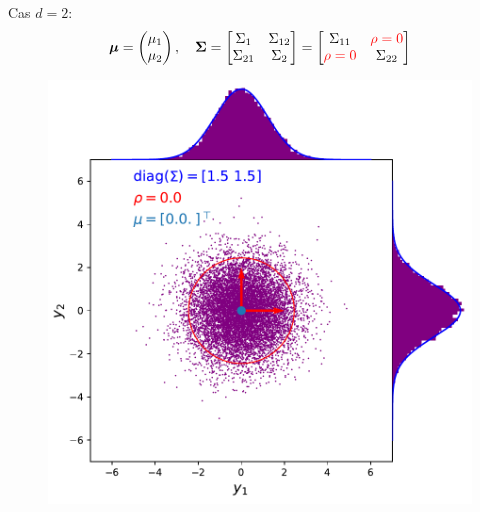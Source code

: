 \documentclass[xcolor=svgnames, t]{beamer}
\newcommand{\vectorx}[1]{\boldsymbol{\MakeLowercase{\mathbf{#1}}}}
\newcommand{\matrixx}[1]{\boldsymbol{\MakeUppercase{#1}}}
\begin{document}
\begin{frame}
  Cas $d=2$:
  \begin{equation*}
    \vectorx{\mu}
    =
    \begin{pmatrix}
      \mu_1 \\
      \mu_2
    \end{pmatrix},
    \quad
    \matrixx{\Sigma}
    =
      \begin{bmatrix}
        \Sigma_{1} & \Sigma_{12} \\
        \Sigma_{21} & \Sigma_{2}
      \end{bmatrix}
    =
      \begin{bmatrix}
        \Sigma_{11} & \color{red}\rho = 0 \\
        \color{red}\rho = 0 & \Sigma_{22}
      \end{bmatrix}
  \end{equation*}
% 
  \begin{figure}
    \includegraphics[scale=0.4]{gaussian_2d_rho_null.pdf}
  \end{figure}
\end{frame}
\end{document}
